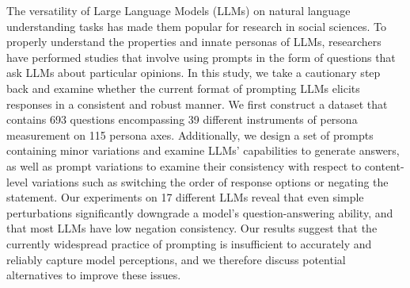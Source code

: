 The versatility of Large Language Models (LLMs) on natural language understanding tasks has made them popular for research in social sciences. To properly understand the properties and innate personas of LLMs, researchers have performed studies that involve using prompts in the form of questions that ask LLMs about particular opinions. In this study, we take a cautionary step back and examine whether the current format of prompting LLMs elicits responses in a consistent and robust manner. We first construct a dataset that contains 693 questions encompassing 39 different instruments of persona measurement on 115 persona axes. Additionally, we design a set of prompts containing minor variations and examine LLMs' capabilities to generate answers, as well as prompt variations to examine their consistency with respect to content-level variations such as switching the order of response options or negating the statement. Our experiments on 17 different LLMs reveal that even simple perturbations significantly downgrade a model's question-answering ability, and that most LLMs have low negation consistency. Our results suggest that the currently widespread practice of prompting is insufficient to accurately and reliably capture model perceptions, and we therefore discuss potential alternatives to improve these issues.